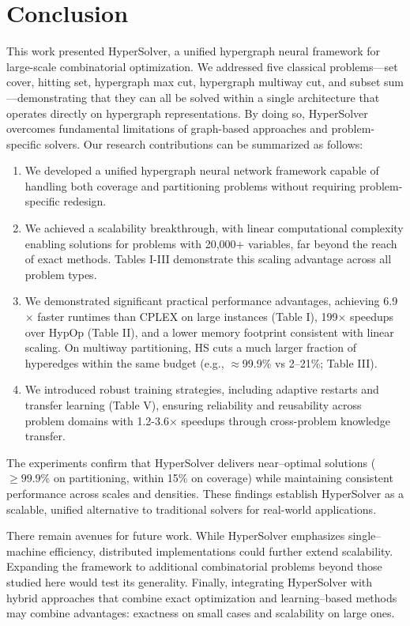 \documentclass[conference]{IEEEtran}
\begin{document}
\section{Conclusion}
This work presented HyperSolver, a unified hypergraph neural framework for large-scale combinatorial optimization. We addressed five classical problems---set cover, hitting set, hypergraph max cut, hypergraph multiway cut, and subset sum---demonstrating that they can all be solved within a single architecture that operates directly on hypergraph representations. By doing so, HyperSolver overcomes fundamental limitations of graph-based approaches and problem-specific solvers.
Our research contributions can be summarized as follows:
\begin{enumerate}
\item We developed a unified hypergraph neural network framework capable of handling both coverage and partitioning problems without requiring problem-specific redesign.

\item We achieved a scalability breakthrough, with linear computational complexity enabling solutions for problems with 20,000+ variables, far beyond the reach of exact methods. Tables I-III demonstrate this scaling advantage across all problem types.

\item We demonstrated significant practical performance advantages, achieving 6.9\(\times\) faster runtimes than CPLEX on large instances (Table I), 199\(\times\) speedups over HypOp (Table II), and a lower memory footprint consistent with linear scaling. On multiway partitioning, HS cuts a much larger fraction of hyperedges within the same budget (e.g., \(\approx\)99.9\% vs 2–21\%; Table III).

\item We introduced robust training strategies, including adaptive restarts and transfer learning (Table V), ensuring reliability and reusability across problem domains with 1.2-3.6\(\times\) speedups through cross-problem knowledge transfer.
\end{enumerate}

The experiments confirm that HyperSolver delivers near--optimal solutions (\(\geq 99.9\%\) on partitioning, within 15\% on coverage) while maintaining consistent performance across scales and densities. These findings establish HyperSolver as a scalable, unified alternative to traditional solvers for real-world applications.

There remain avenues for future work. While HyperSolver emphasizes single--machine efficiency, distributed implementations could further extend scalability. Expanding the framework to additional combinatorial problems beyond those studied here would test its generality. Finally, integrating HyperSolver with hybrid approaches that combine exact optimization and learning--based methods may combine advantages: exactness on small cases and scalability on large ones.
\end{document}
